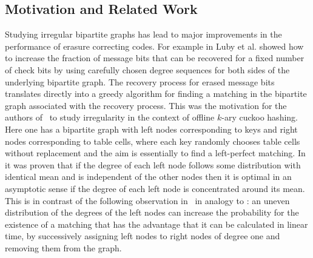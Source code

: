 \let\accentvec\vec \documentclass{llncs}
\begin{document}
\subsection{Motivation and Related Work}
Studying irregular bipartite graphs has lead to major improvements 
in the performance of erasure correcting codes.
For example in \cite{LMSS_Tornado_2001} Luby et al. showed how to increase the
fraction of message bits that can be recovered 
for a fixed number of check bits by using carefully
chosen degree sequences for both sides of the underlying bipartite graph.
The recovery process for erased message bits 
translates directly into a greedy algorithm 
for finding a matching in the bipartite graph associated with the recovery process.
This was the motivation for the authors of~\cite{DGMMPR_tight_2009_full,DGMMPR_tight_2010}
to study irregularity in the context of offline $k$-ary cuckoo hashing.
Here one has a bipartite graph with left nodes corresponding to
keys and right nodes corresponding to table cells,
where each key randomly chooses table cells without replacement and 
the aim is essentially to find a left-perfect matching.
In \cite{DGMMPR_tight_2009_full} it was proven that if the degree of each left node 
follows some distribution with identical mean
and is independent of the other nodes then 
it is optimal in an asymptotic sense if
the degree of each left node is concentrated around its mean.
This is in contrast of the following observation 
in~\cite{R_mixed_preparation} in analogy to \cite{LMSS_Tornado_2001}:
an uneven distribution of the degrees of the left nodes
can increase the probability for the existence of a matching that has the advantage that it can be calculated
in linear time, by successively assigning left nodes to right nodes of degree one and removing them from the graph.
\end{document}
